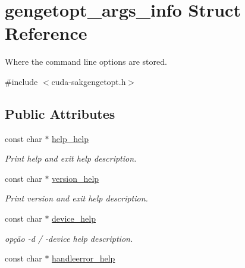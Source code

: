 \hypertarget{structgengetopt__args__info}{\section{gengetopt\-\_\-args\-\_\-info Struct Reference}
\label{structgengetopt__args__info}
}


Where the command line options are stored.  




{\ttfamily \#include $<$cuda-\/sakgengetopt.\-h$>$}

\subsection*{Public Attributes}
\begin{DoxyCompactItemize}
\item 
\hypertarget{structgengetopt__args__info_afb4efa68a6f43a4d112e9b96ffe89101}{const char $\ast$ \hyperlink{structgengetopt__args__info_afb4efa68a6f43a4d112e9b96ffe89101}{help\-\_\-help}}\label{structgengetopt__args__info_afb4efa68a6f43a4d112e9b96ffe89101}

\begin{DoxyCompactList}\small\item\em Print help and exit help description. \end{DoxyCompactList}\item 
\hypertarget{structgengetopt__args__info_adef454ea6f3ff4114ae5009e58360cfc}{const char $\ast$ \hyperlink{structgengetopt__args__info_adef454ea6f3ff4114ae5009e58360cfc}{version\-\_\-help}}\label{structgengetopt__args__info_adef454ea6f3ff4114ae5009e58360cfc}

\begin{DoxyCompactList}\small\item\em Print version and exit help description. \end{DoxyCompactList}\item 
\hypertarget{structgengetopt__args__info_a96422e1025f676b6d623021a0abca889}{const char $\ast$ \hyperlink{structgengetopt__args__info_a96422e1025f676b6d623021a0abca889}{device\-\_\-help}}\label{structgengetopt__args__info_a96422e1025f676b6d623021a0abca889}

\begin{DoxyCompactList}\small\item\em opção -\/d / -\/device help description. \end{DoxyCompactList}\item 
\hypertarget{structgengetopt__args__info_aea64a8ced0e6313b1300e2a1c5e2f9a4}{const char $\ast$ \hyperlink{structgengetopt__args__info_aea64a8ced0e6313b1300e2a1c5e2f9a4}{handleerror\-\_\-help}}\label{structgengetopt__args__info_aea64a8ced0e6313b1300e2a1c5e2f9a4}


\end{DoxyCompactItemize}
